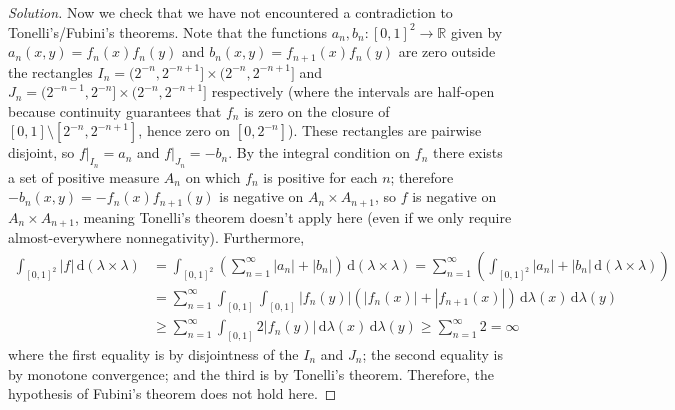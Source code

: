 \documentclass[10pt]{article}
\newcommand{\dd}{\,\mathrm{d}}
\providecommand{\RR}{\mathbb R}
\newenvironment{soln}{\begin{proof}[Solution]}{\end{proof}}
\providecommand{\abs}[1]{\left\lvert #1\right\rvert}
\begin{document}
\begin{soln}
    Now we check that we have not encountered a contradiction
    to Tonelli's/Fubini's theorems.
    Note that the functions $a_n,b_n\colon[0,1]^2\to\RR$ given by
    $a_n(x,y) = f_n(x)f_n(y)$ and $b_n(x,y) = f_{n+1}(x)f_n(y)$
    are zero outside the rectangles $I_n = (2^{-n},2^{-n+1}]\times(2^{-n},2^{-n+1}]$
    and $J_n = (2^{-n-1},2^{-n}]\times(2^{-n},2^{-n+1}]$ respectively
    (where the intervals are half-open because continuity guarantees
    that $f_n$ is zero on the closure of $[0,1]\setminus[2^{-n},2^{-n+1}]$,
    hence zero on $[0,2^{-n}]$).
    These rectangles are pairwise disjoint, so $f|_{I_n} = a_n$ and $f|_{J_n} = -b_n$.
    By the integral condition on $f_n$ there exists a set of positive measure $A_n$
    on which $f_n$ is positive for each $n$; therefore
    $-b_n(x,y) = -f_n(x)f_{n+1}(y)$ is negative on $A_n\times A_{n+1}$,
    so $f$ is negative on $A_n\times A_{n+1}$,
    meaning Tonelli's theorem doesn't apply here
    (even if we only require almost-everywhere nonnegativity).
    Furthermore,
    \begin{align*}
        \int_{[0,1]^2}\abs f
	\dd(\lambda\times\lambda)
	&= \int_{[0,1]^2}\left(
	\sum_{n=1}^\infty \abs{a_n} + \abs{b_n}\right)
	\dd(\lambda\times\lambda)
	= \sum_{n=1}^\infty\left(\int_{[0,1]^2}
	\abs{a_n} + \abs{b_n}
	\dd(\lambda\times\lambda)\right)\\
	&= \sum_{n=1}^\infty\int_{[0,1]}\int_{[0,1]}
	\abs{f_n(y)}(\abs{f_n(x)} + \abs{f_{n+1}(x)})
	\dd\lambda(x)\dd\lambda(y)\\
	&\ge \sum_{n=1}^\infty\int_{[0,1]}2\abs{f_n(y)}
	\dd\lambda(x)\dd\lambda(y) \ge \sum_{n=1}^\infty 2 = \infty
    \end{align*}
    where the first equality is by disjointness of the $I_n$ and $J_n$;
    the second equality is by monotone convergence;
    and the third is by Tonelli's theorem.
    Therefore, the hypothesis of Fubini's theorem does not hold here.
\end{soln}
\end{document}
